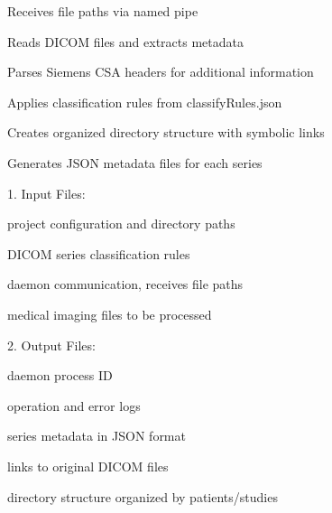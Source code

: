 \documentclass[letterpaper,10pt,english]{sphinxmanual}
\begin{document}
\begin{DUlineblock}{0em}
\item[] \sphinxhyphen{} Receives file paths via named pipe
\item[] \sphinxhyphen{} Reads DICOM files and extracts metadata
\item[] \sphinxhyphen{} Parses Siemens CSA headers for additional information
\item[] \sphinxhyphen{} Applies classification rules from classifyRules.json
\item[] \sphinxhyphen{} Creates organized directory structure with symbolic links
\item[] \sphinxhyphen{} Generates JSON metadata files for each series
\end{DUlineblock}

\sphinxAtStartPar
{}


\sphinxAtStartPar
{}

\begin{DUlineblock}{0em}
\item[] 1. Input Files:
\end{DUlineblock}

\begin{DUlineblock}{0em}
\item[] \sphinxhyphen{}  \sphinxhyphen{} project configuration and directory paths
\item[] \sphinxhyphen{}  \sphinxhyphen{} DICOM series classification rules
\item[] \sphinxhyphen{}  \sphinxhyphen{} daemon communication, receives file paths
\item[] \sphinxhyphen{}  \sphinxhyphen{} medical imaging files to be processed
\end{DUlineblock}

\begin{DUlineblock}{0em}
\item[] 2. Output Files:
\end{DUlineblock}

\begin{DUlineblock}{0em}
\item[] \sphinxhyphen{}  \sphinxhyphen{} daemon process ID
\item[] \sphinxhyphen{}  \sphinxhyphen{} operation and error logs
\item[] \sphinxhyphen{}  \sphinxhyphen{} series metadata in JSON format
\item[] \sphinxhyphen{}  \sphinxhyphen{} links to original DICOM files
\item[] \sphinxhyphen{}  \sphinxhyphen{} directory structure organized by patients/studies
\end{DUlineblock}
\end{document}
